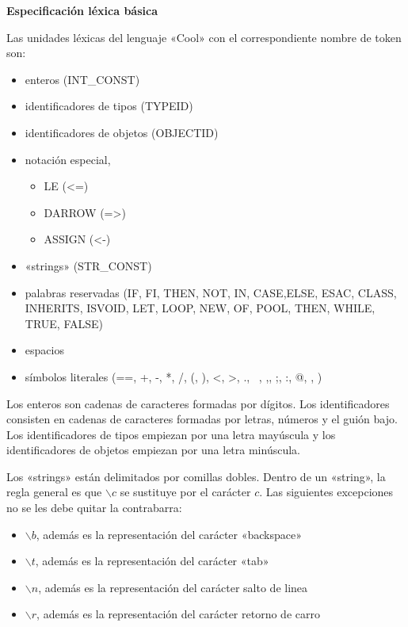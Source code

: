 \documentclass{article}
\begin{document}
\vspace{5mm}\centerline{\large\bf Especificación léxica básica}\vspace{5mm}
\label{sec:org5f7cbf4}

Las unidades léxicas del lenguaje «Cool» con el correspondiente nombre de token son:
\begin{itemize}
\item enteros (INT\_CONST)
\item identificadores de tipos (TYPEID)
\item identificadores de objetos (OBJECTID)
\item notación especial,
  \begin{itemize}
  \item LE (<=)
  \item DARROW (=>)
  \item ASSIGN (<-)
  \end{itemize}
\item «strings» (STR_CONST)
\item palabras reservadas (IF, FI, THEN,
                          NOT, IN, CASE,ELSE,
                          ESAC, CLASS, INHERITS,
                          ISVOID, LET, LOOP, NEW, OF, POOL,
                           THEN, WHILE, TRUE, FALSE)
\item espacios
\item símbolos literales (==, +, -, *, /, (, ), <, >, ., ~, ,, ;, :, @, {, } )
\end{itemize}

Los enteros son cadenas de caracteres formadas por dígitos. Los
identificadores consisten en cadenas de caracteres formadas por
letras, números y el guión bajo. Los identificadores de tipos empiezan
por una letra mayúscula y los identificadores de objetos empiezan por
una letra minúscula. %


Los «strings» están delimitados por comillas dobles. Dentro de un
«string», la regla general es que  $\backslash c$ se sustituye por el
carácter $c$.  
Las siguientes excepciones no se les debe quitar la contrabarra:

\begin{itemize}
\item $\backslash b$, además es la representación del carácter «backspace»
\item $\backslash t$, además es la representación del carácter «tab»
\item $\backslash n$, además es la representación del carácter salto de linea
\item $\backslash r$, además es la representación del carácter retorno de carro
\end{itemize}
\end{document}
